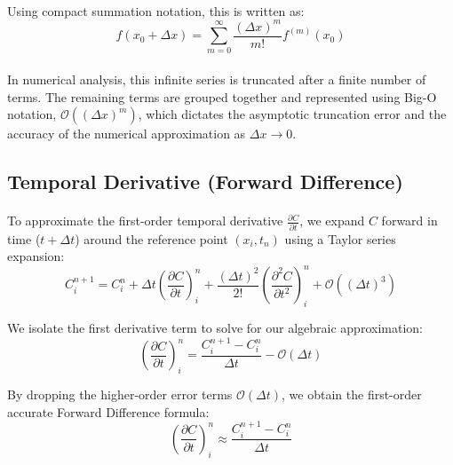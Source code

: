 \paragraph{}
Using compact summation notation, this is written as:
\begin{equation}
\label{eq:tsec}
f(x_0 + \Delta x) = \sum_{m=0}^{\infty} \frac{(\Delta x)^m}{m!} f^{(m)}(x_0)
\end{equation}
\paragraph{}
In numerical analysis, this infinite series is truncated after a finite number of terms. The remaining terms are grouped together and represented using Big-O notation, $\mathcal{O}((\Delta x)^m)$, which dictates the asymptotic truncation error and the accuracy of the numerical approximation as $\Delta x \to 0$.

\subsection*{Temporal Derivative (Forward Difference)}
\paragraph{}
To approximate the first-order temporal derivative $\frac{\partial C}{\partial t}$, we expand $C$ forward in time ($t + \Delta t$) around the reference point $(x_i, t_n)$ using a Taylor series expansion:
\begin{equation*}
C_i^{n+1} = C_i^n + \Delta t \left( \frac{\partial C}{\partial t} \right)_i^n + \frac{(\Delta t)^2}{2!} \left( \frac{\partial^2 C}{\partial t^2} \right)_i^n + \mathcal{O}((\Delta t)^3)
\end{equation*}

We isolate the first derivative term to solve for our algebraic approximation:
\begin{equation*}
\left( \frac{\partial C}{\partial t} \right)_i^n = \frac{C_i^{n+1} - C_i^n}{\Delta t} - \mathcal{O}(\Delta t)
\end{equation*}

By dropping the higher-order error terms $\mathcal{O}(\Delta t)$, we obtain the first-order accurate Forward Difference formula:
\begin{equation}
\label{eq:ftcsfd}
\left( \frac{\partial C}{\partial t} \right)_i^n \approx \frac{C_i^{n+1} - C_i^n}{\Delta t}
\end{equation}

